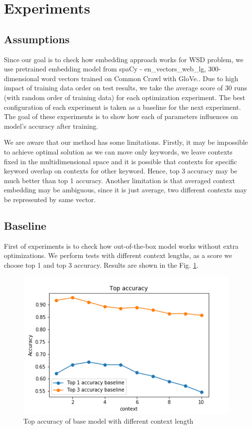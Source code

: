 \documentclass{llncs}
\begin{document}
\section{Experiments}
\subsection{Assumptions}
Since our goal is to check how embedding approach works for WSD problem, we use pretrained embedding model from spaCy - en\_vectors\_web\_lg, 300-dimensional word vectors trained on Common Crawl with GloVe.\cite{spacymodel}.
Due to high impact of training data order on test results, we take the average score of 30 runs (with random order of training data) for each optimization experiment.
The best configuration of each experiment is taken as a baseline for the next experiment.
The goal of these experiments is to show how each of parameters influences on model's accuracy after training.

We are aware that our method has some limitations.
Firstly, it may be impossible to achieve optimal solution as we can move only keywords, we leave contexts fixed in the multidimensional space and it is possible that contexts for specific keyword overlap on contexts for other keyword. Hence, top 3 accuracy may be much better than top 1 accuracy.
Another limitation is that averaged context embedding may be ambiguous, since it is just average, two different contexts may be represented by same vector.
\subsection{Baseline}
First of experiments is to check how out-of-the-box model works without extra optimizations. We perform tests with different context lengths, as a score we choose top 1 and top 3 accuracy. Results are shown in the Fig. \ref{fig:baseline}.

\begin{figure}
    \label{fig:baseline}
    \caption{Top accuracy of base model with different context length}
    \includegraphics[scale=0.5]{res/baseline_context_top_acc.png}
\end{figure}
\end{document}
